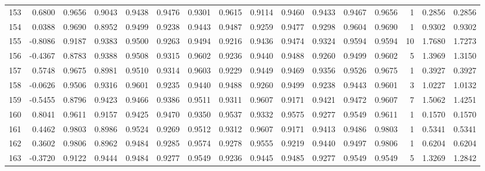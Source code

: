 \begin{tabular}{lrrrrrrrrrrrrrrr}
153 &      0.6800 &  0.9656 &  0.9043 &  0.9438 &  0.9476 &  0.9301 &  0.9615 &  0.9114 &  0.9460 &  0.9433 &   0.9467 &     0.9656 &      1 &                    0.2856 &                     0.2856 \\
154 &      0.0388 &  0.9690 &  0.8952 &  0.9499 &  0.9238 &  0.9443 &  0.9487 &  0.9259 &  0.9477 &  0.9298 &   0.9604 &     0.9690 &      1 &                    0.9302 &                     0.9302 \\
155 &     -0.8086 &  0.9187 &  0.9383 &  0.9500 &  0.9263 &  0.9494 &  0.9216 &  0.9436 &  0.9474 &  0.9324 &   0.9594 &     0.9594 &     10 &                    1.7680 &                     1.7273 \\
156 &     -0.4367 &  0.8783 &  0.9388 &  0.9508 &  0.9315 &  0.9602 &  0.9236 &  0.9440 &  0.9488 &  0.9260 &   0.9499 &     0.9602 &      5 &                    1.3969 &                     1.3150 \\
157 &      0.5748 &  0.9675 &  0.8981 &  0.9510 &  0.9314 &  0.9603 &  0.9229 &  0.9449 &  0.9469 &  0.9356 &   0.9526 &     0.9675 &      1 &                    0.3927 &                     0.3927 \\
158 &     -0.0626 &  0.9506 &  0.9316 &  0.9601 &  0.9235 &  0.9440 &  0.9488 &  0.9260 &  0.9499 &  0.9238 &   0.9443 &     0.9601 &      3 &                    1.0227 &                     1.0132 \\
159 &     -0.5455 &  0.8796 &  0.9423 &  0.9466 &  0.9386 &  0.9511 &  0.9311 &  0.9607 &  0.9171 &  0.9421 &   0.9472 &     0.9607 &      7 &                    1.5062 &                     1.4251 \\
160 &      0.8041 &  0.9611 &  0.9157 &  0.9425 &  0.9470 &  0.9350 &  0.9537 &  0.9332 &  0.9575 &  0.9277 &   0.9549 &     0.9611 &      1 &                    0.1570 &                     0.1570 \\
161 &      0.4462 &  0.9803 &  0.8986 &  0.9524 &  0.9269 &  0.9512 &  0.9312 &  0.9607 &  0.9171 &  0.9413 &   0.9486 &     0.9803 &      1 &                    0.5341 &                     0.5341 \\
162 &      0.3602 &  0.9806 &  0.8962 &  0.9484 &  0.9285 &  0.9574 &  0.9278 &  0.9555 &  0.9219 &  0.9440 &   0.9497 &     0.9806 &      1 &                    0.6204 &                     0.6204 \\
163 &     -0.3720 &  0.9122 &  0.9444 &  0.9484 &  0.9277 &  0.9549 &  0.9236 &  0.9445 &  0.9485 &  0.9277 &   0.9549 &     0.9549 &      5 &                    1.3269 &                     1.2842 \\

\end{tabular}
